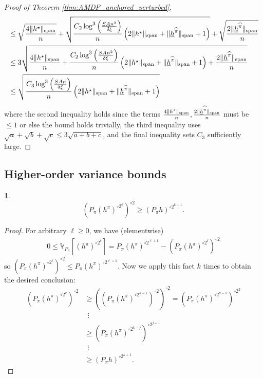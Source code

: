 \documentclass{article}
\theoremstyle{plain}
\theoremstyle{plain}
\newtheorem{lem}[thm]{\protect\lemmaname}
\theoremstyle{remark}
\theoremstyle{plain}
\theoremstyle{plain}
\providecommand{\lemmaname}{Lemma}
\newcommand{\Var}{\mathbb{V}}
\newcommand{\pihat}{\widehat{\pi}}
\newcommand{\hanc}{\underline{h}}
\begin{document}
\begin{proof}[Proof of Theorem \ref{thm:AMDP_anchored_perturbed}]
\begin{align*}
        &\leq \sqrt{\frac{4\spannorm{h^\star}}{n}} + \sqrt{\frac{C_2  \log^3 \left( \frac{SAn^2}{ \delta \xi}\right) }{n}\left( 2\spannorm{h^\star} + \spannorm{\hanc^{\pihat}} + 1\right) } + \sqrt{\frac{2\spannorm{\hanc^{\pihat}}}{n}} \\
        & \leq 3\sqrt{ \frac{4\spannorm{h^\star}}{n} + \frac{C_2  \log^3 \left( \frac{SAn^2}{ \delta \xi}\right) }{n}\left( 2\spannorm{h^\star} + \spannorm{\hanc^{\pihat}} + 1\right) + \frac{2\spannorm{\hanc^{\pihat}}}{n} } \\
        & \leq \sqrt{\frac{C_3  \log^3 \left( \frac{SAn}{ \delta \xi}\right) }{n}\left( 2\spannorm{h^\star} + \spannorm{\hanc^{\pihat}} + 1\right) }
    \end{align*}
    where the second inequality holds since the terms $\frac{4\spannorm{h^\star}}{n}, \frac{2\spannorm{\hanc^{\pihat}}}{n}$ must be $\leq 1$ or else the bound holds trivially, the third inequality uses $\sqrt{a} + \sqrt{b} + \sqrt{c} \leq 3\sqrt{a + b + c}$, and the final inequality sets $C_3$ sufficiently large.
\end{proof}

\subsection{Higher-order variance bounds}
\label{sec:AMDP_high_order_var_bounds}
\begin{lem}
\label{lem:moment_inequality}
    \[\left(P_\pi (h^\pi)^{\circ 2^k}\right)^{\circ 2} \geq (P_\pi h)^{\circ 2^{k+1}}.\]
\end{lem}
\begin{proof}
    For arbitrary $\ell \geq 0$, we have (elementwise)
    \begin{align*}
        0 \leq \Var_{P_\pi} \left[(h^{\pi})^{\circ 2^\ell}\right] = P_\pi (h^\pi)^{\circ 2^{\ell+1}} - \left(P_\pi(h^\pi)^{\circ 2^\ell}\right)^{\circ 2}
    \end{align*}
    so $\left(P_\pi(h^\pi)^{\circ 2^\ell}\right)^{\circ 2} \leq P_\pi (h^\pi)^{\circ 2^{\ell+1}}$. Now we apply this fact $k$ times to obtain the desired conclusion:
    \begin{align*}
        \left(P_\pi (h^\pi)^{\circ 2^k}\right)^{\circ 2} &\geq \left( \left( P_\pi (h^\pi)^{\circ 2^{k-1}}\right)^{\circ 2} \right)^{\circ 2} =  \left( P_\pi (h^\pi)^{\circ 2^{k-1}}\right)^{\circ 2^2} \\
        &~~\vdots \\
        & \geq \left( P_\pi (h^\pi)^{\circ 2^{k-j}}\right)^{\circ 2^{j+1}} \\
        &~~\vdots \\
        & \geq (P_\pi h)^{\circ 2^{k+1}}.
    \end{align*}
\end{proof}
\end{document}
